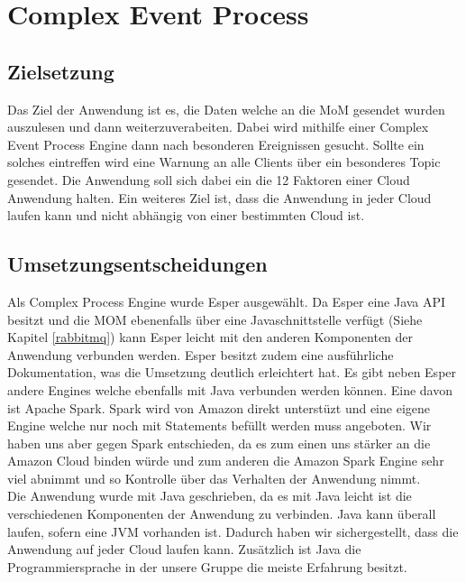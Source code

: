 \chapter{Complex Event Process}\label{cep}


\section{Zielsetzung}
Das Ziel der Anwendung ist es, die Daten welche an die MoM gesendet wurden auszulesen und dann weiterzuverabeiten. Dabei wird mithilfe einer Complex Event Process Engine dann nach besonderen Ereignissen gesucht. Sollte ein solches eintreffen wird eine Warnung an alle Clients über ein besonderes Topic gesendet. Die Anwendung soll sich dabei ein die 12 Faktoren einer Cloud Anwendung halten. Ein weiteres Ziel ist, dass die Anwendung in jeder Cloud laufen kann und nicht abhängig von einer bestimmten Cloud ist. 

\section{Umsetzungsentscheidungen}
Als Complex Process Engine wurde Esper ausgewählt. Da Esper eine Java API besitzt und die MOM ebenenfalls über eine Javaschnittstelle verfügt (Siehe Kapitel \ref{rabbitmq}) kann Esper leicht mit den anderen Komponenten der Anwendung verbunden werden. Esper besitzt zudem eine ausführliche Dokumentation, was die Umsetzung deutlich erleichtert hat. Es gibt neben Esper andere Engines welche ebenfalls mit Java verbunden werden können. Eine davon ist Apache Spark. Spark wird von Amazon direkt unterstüzt und eine eigene Engine welche nur noch mit Statements befüllt werden muss angeboten. Wir haben uns aber gegen Spark entschieden, da es zum einen uns stärker an die Amazon Cloud binden würde und zum anderen die Amazon Spark Engine sehr viel abnimmt und so Kontrolle über das Verhalten der Anwendung nimmt. 
\\
Die Anwendung wurde mit Java geschrieben, da es mit Java leicht ist die verschiedenen Komponenten der Anwendung zu verbinden. Java kann überall laufen, sofern eine JVM vorhanden ist. Dadurch haben wir sichergestellt, dass die Anwendung auf jeder Cloud laufen kann. Zusätzlich ist Java die Programmiersprache in der unsere Gruppe die meiste Erfahrung besitzt.   

